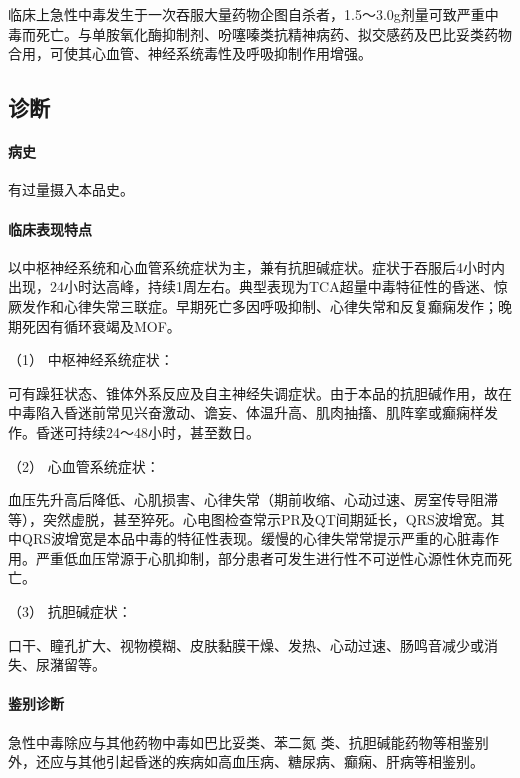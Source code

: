 临床上急性中毒发生于一次吞服大量药物企图自杀者，1.5～3.0g剂量可致严重中毒而死亡。与单胺氧化酶抑制剂、吩噻嗪类抗精神病药、拟交感药及巴比妥类药物合用，可使其心血管、神经系统毒性及呼吸抑制作用增强。

\subsection{诊断}

\paragraph{病史}

有过量摄入本品史。

\paragraph{临床表现特点}

以中枢神经系统和心血管系统症状为主，兼有抗胆碱症状。症状于吞服后4小时内出现，24小时达高峰，持续1周左右。典型表现为TCA超量中毒特征性的昏迷、惊厥发作和心律失常三联症。早期死亡多因呼吸抑制、心律失常和反复癫痫发作；晚期死因有循环衰竭及MOF。

\hypertarget{text00134.htmlux5cux23CHP5-2-4-2-2-1}{}
（1） 中枢神经系统症状：

可有躁狂状态、锥体外系反应及自主神经失调症状。由于本品的抗胆碱作用，故在中毒陷入昏迷前常见兴奋激动、谵妄、体温升高、肌肉抽搐、肌阵挛或癫痫样发作。昏迷可持续24～48小时，甚至数日。

\hypertarget{text00134.htmlux5cux23CHP5-2-4-2-2-2}{}
（2） 心血管系统症状：

血压先升高后降低、心肌损害、心律失常（期前收缩、心动过速、房室传导阻滞等），突然虚脱，甚至猝死。心电图检查常示PR及QT间期延长，QRS波增宽。其中QRS波增宽是本品中毒的特征性表现。缓慢的心律失常常提示严重的心脏毒作用。严重低血压常源于心肌抑制，部分患者可发生进行性不可逆性心源性休克而死亡。

\hypertarget{text00134.htmlux5cux23CHP5-2-4-2-2-3}{}
（3） 抗胆碱症状：

口干、瞳孔扩大、视物模糊、皮肤黏膜干燥、发热、心动过速、肠鸣音减少或消失、尿潴留等。

\paragraph{鉴别诊断}

急性中毒除应与其他药物中毒如巴比妥类、苯二氮{}
类、抗胆碱能药物等相鉴别外，还应与其他引起昏迷的疾病如高血压病、糖尿病、癫痫、肝病等相鉴别。

